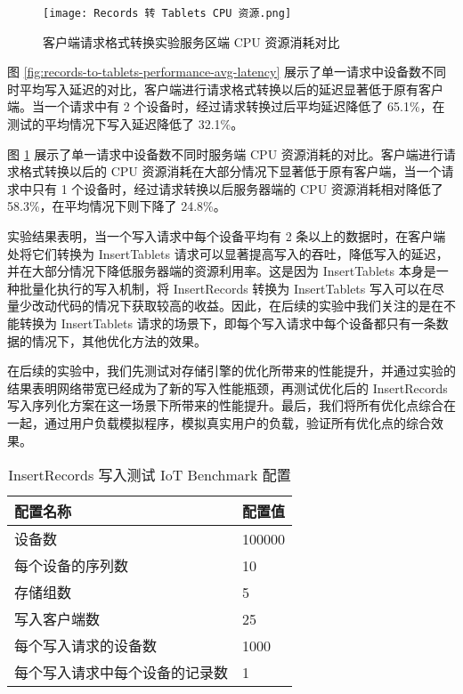 \begin{figure}
  \centering
  \texttt{[image: Records 转 Tablets CPU 资源.png]}
  \caption{客户端请求格式转换实验服务区端 CPU 资源消耗对比}
  \label{fig:records-to-tablets-performance-cpu-consuming}
\end{figure}

图 \ref{fig:records-to-tablets-performance-avg-latency} 展示了单一请求中设备数不同时平均写入延迟的对比，客户端进行请求格式转换以后的延迟显著低于原有客户端。当一个请求中有 2 个设备时，经过请求转换过后平均延迟降低了 65.1\%，在测试的平均情况下写入延迟降低了 32.1\%。

图 \ref{fig:records-to-tablets-performance-cpu-consuming} 展示了单一请求中设备数不同时服务端 CPU 资源消耗的对比。客户端进行请求格式转换以后的 CPU 资源消耗在大部分情况下显著低于原有客户端，当一个请求中只有 1 个设备时，经过请求转换以后服务器端的 CPU 资源消耗相对降低了 58.3\%，在平均情况下则下降了 24.8\%。 %

实验结果表明，当一个写入请求中每个设备平均有 2 条以上的数据时，在客户端处将它们转换为 InsertTablets 请求可以显著提高写入的吞吐，降低写入的延迟，并在大部分情况下降低服务器端的资源利用率。这是因为 InsertTablets 本身是一种批量化执行的写入机制，将 InsertRecords 转换为 InsertTablets 写入可以在尽量少改动代码的情况下获取较高的收益。因此，在后续的实验中我们关注的是在不能转换为 InsertTablets 请求的场景下，即每个写入请求中每个设备都只有一条数据的情况下，其他优化方法的效果。

在后续的实验中，我们先测试对存储引擎的优化所带来的性能提升，并通过实验的结果表明网络带宽已经成为了新的写入性能瓶颈，再测试优化后的 InsertRecords 写入序列化方案在这一场景下所带来的性能提升。最后，我们将所有优化点综合在一起，通过用户负载模拟程序，模拟真实用户的负载，验证所有优化点的综合效果。

\begin{table}
  \centering
  \caption{InsertRecords 写入测试 IoT Benchmark 配置}
  \begin{tabular}{ll}
    \toprule
    配置名称 & 配置值 \\
    \midrule 
    设备数 & 100000 \\
    每个设备的序列数 & 10 \\
    存储组数 & 5 \\
    写入客户端数 & 25 \\
    每个写入请求的设备数 & 1000 \\
    每个写入请求中每个设备的记录数 & 1 \\
    \bottomrule
  \end{tabular}
  \label{tabular:test-req-format-iot-benchmark-config-2}
\end{table}

